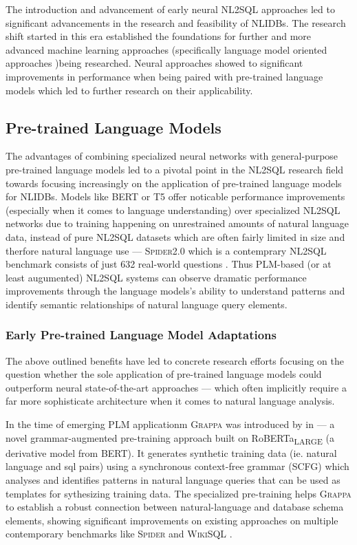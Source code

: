 \documentclass{article}
\begin{document}
The introduction and advancement of early neural NL2SQL approaches led to significant advancements in the research and feasibility
of NLIDBs. The research shift started in this era established the foundations for further and more advanced machine learning 
approaches (specifically language model oriented approaches )being researched. Neural approaches showed to significant 
improvements in performance when being paired with pre-trained language models \citep{RATSQL} which led to further research on 
their applicability.

\subsection{Pre-trained Language Models}

The advantages of combining specialized neural networks with general-purpose pre-trained language models
led to a pivotal point in the NL2SQL research field towards focusing increasingly on the application of pre-trained
language models for NLIDBs. Models like BERT or T5 offer noticable performance improvements (especially when it
comes to language understanding) over specialized NL2SQL networks due to training happening on unrestrained amounts
of natural language data, instead of pure NL2SQL datasets which are often fairly limited in size and therfore natural
language use — \textsc{Spider2.0} which is a contemprary NL2SQL benchmark consists of just 632 real-world questions 
\citep{Spider2}. Thus PLM-based (or at least augumented) NL2SQL systems can observe dramatic performance improvements
through the language models's ability to understand patterns and identify semantic relationships of natural language
query elements. 

\subsubsection{Early Pre-trained Language Model Adaptations}

The above outlined benefits have led to concrete research efforts focusing on the question whether the sole application
of pre-trained language models could outperform neural state-of-the-art approaches — which often implicitly require
a far more sophisticate architecture when it comes to natural language analysis.

In the time of emerging PLM applicationm \textsc{Grappa} was introduced by \citeauthor*{GRAPPA} in \citeyear{GRAPPA} —
a novel grammar-augmented pre-training approach built on RoBERTa\textsubscript{\tiny{LARGE}} (a derivative model from BERT).
It generates synthetic training data (ie. natural language and sql pairs) using a synchronous context-free grammar (SCFG)
which analyses and identifies patterns in natural language queries that can be used as templates for sythesizing training
data. The specialized pre-training helps \textsc{Grappa} to establish a robust connection between natural-language and
database schema elements, showing significant improvements on existing approaches on multiple contemporary benchmarks like 
\textsc{Spider} and \textsc{WikiSQL} \citep{GRAPPA}.
\end{document}

